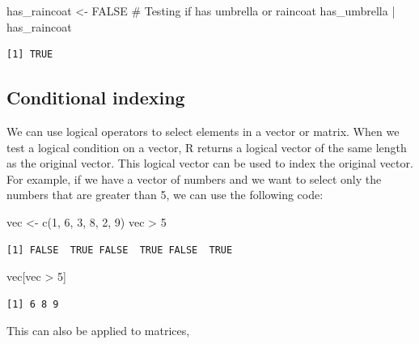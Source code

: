 \documentclass[
  letterpaper,
  DIV=11,
  numbers=noendperiod]{scrreprt}
\newenvironment{Shaded}{\begin{snugshade}}{\end{snugshade}}
\newcommand{\CommentTok}[1]{\textcolor[rgb]{0.37,0.37,0.37}{#1}}
\newcommand{\ConstantTok}[1]{\textcolor[rgb]{0.56,0.35,0.01}{#1}}
\newcommand{\DecValTok}[1]{\textcolor[rgb]{0.68,0.00,0.00}{#1}}
\newcommand{\FunctionTok}[1]{\textcolor[rgb]{0.28,0.35,0.67}{#1}}
\newcommand{\NormalTok}[1]{\textcolor[rgb]{0.00,0.23,0.31}{#1}}
\newcommand{\OtherTok}[1]{\textcolor[rgb]{0.00,0.23,0.31}{#1}}
\newcommand{\SpecialCharTok}[1]{\textcolor[rgb]{0.37,0.37,0.37}{#1}}
\begin{document}
\begin{Shaded}
\begin{Highlighting}[]
\NormalTok{has\_raincoat }\OtherTok{\textless{}{-}} \ConstantTok{FALSE}
\CommentTok{\# Testing if has umbrella or raincoat}
\NormalTok{has\_umbrella }\SpecialCharTok{|}\NormalTok{ has\_raincoat}
\end{Highlighting}
\end{Shaded}

\begin{verbatim}
[1] TRUE
\end{verbatim}

\subsection{Conditional indexing}\label{sec-conditional-indexing}

We can use logical operators to select elements in a vector or matrix.
When we test a logical condition on a vector, R returns a logical vector
of the same length as the original vector. This logical vector can be
used to index the original vector. For example, if we have a vector of
numbers and we want to select only the numbers that are greater than 5,
we can use the following code:

\begin{Shaded}
\begin{Highlighting}[]
\NormalTok{vec }\OtherTok{\textless{}{-}} \FunctionTok{c}\NormalTok{(}\DecValTok{1}\NormalTok{, }\DecValTok{6}\NormalTok{, }\DecValTok{3}\NormalTok{, }\DecValTok{8}\NormalTok{, }\DecValTok{2}\NormalTok{, }\DecValTok{9}\NormalTok{)}
\NormalTok{vec }\SpecialCharTok{\textgreater{}} \DecValTok{5}
\end{Highlighting}
\end{Shaded}

\begin{verbatim}
[1] FALSE  TRUE FALSE  TRUE FALSE  TRUE
\end{verbatim}

\begin{Shaded}
\begin{Highlighting}[]
\NormalTok{vec[vec }\SpecialCharTok{\textgreater{}} \DecValTok{5}\NormalTok{]}
\end{Highlighting}
\end{Shaded}

\begin{verbatim}
[1] 6 8 9
\end{verbatim}

This can also be applied to matrices,
\end{document}
